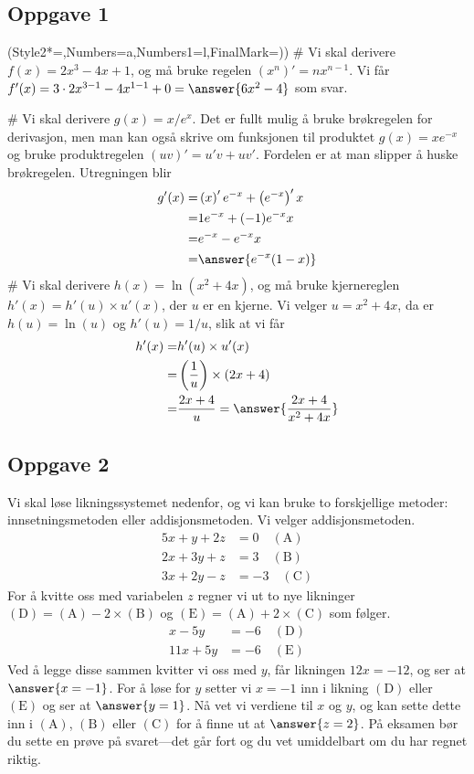 \subsection*{Oppgave 1}
\begin{easylist}[enumerate]
\ListProperties(Style2*=,Numbers=a,Numbers1=l,FinalMark={)})
# Vi skal derivere $f(x) = 2x^3 - 4x + 1$, og må bruke regelen $\left(x^n\right)' = nx^{n-1}$.
Vi får $f'(x) = 3\cdot2x^{3-1} - 4 x ^{1-1} + 0 = \answer{6x^2 - 4}$ som svar.

# Vi skal derivere $g(x) = x / e^x$. Det er fullt mulig å bruke brøkregelen for derivasjon, men man kan også skrive om funksjonen til produktet $g(x) = x e^{-x}$ og bruke produktregelen $(uv)' = u'v + uv'$.
Fordelen er at man slipper å huske brøkregelen.
Utregningen blir
\begin{align*}
	g'(x) =& \left(x \right)' e^{-x} + \left( e^{-x} \right)' x \\
	=& 1 e^{-x} + (-1)e^{-x}  x \\
	=& e^{-x} - e^{-x}  x \\
	=& \answer{e^{-x}(1 - x)}
\end{align*}
# Vi skal derivere $h(x) = \ln \left( x^2 + 4x\right)$, og må bruke kjernereglen $h'(x) = h'(u) \times u'(x)$, der $u$ er en kjerne.
Vi velger $u =x^2 + 4x$, da er $h(u) = \ln(u)$ og $h'(u) = 1/u$, slik at vi får
\begin{align*}
	h'(x) =& h'(u) \times u'(x) \\
	=& \left( \frac{1}{u}  \right) \times \left( 2x + 4 \right) \\
	=& \frac{2x + 4}{u} =  \answer{\frac{2x + 4}{x^2 + 4x}}
\end{align*}
\end{easylist}

\subsection*{Oppgave 2}
Vi skal løse likningssystemet nedenfor, og vi kan bruke to forskjellige metoder: innsetningsmetoden eller addisjonsmetoden.
Vi velger addisjonsmetoden.
\begin{align*}
	5 x + y + 2 z &= 0 \quad (\text{A})\\
	2 x + 3 y + z &= 3 \quad (\text{B})\\
	3 x + 2 y - z &= -3 \quad (\text{C})
\end{align*}
For å kvitte oss med variabelen $z$ regner vi ut to nye likninger $(\text{D}) = (\text{A}) - 2 \times (\text{B})$ og $(\text{E}) = (\text{A}) + 2 \times (\text{C})$ som følger.
\begin{align*}
	x - 5y  &= -6 \quad (\text{D})\\
	11 x + 5 y  &= -6 \quad (\text{E})
\end{align*}
Ved å legge disse sammen kvitter vi oss med $y$, får likningen $12x = -12$, og ser at $\answer{x = -1}$.
For å løse for $y$ setter vi $x=-1$ inn i likning $(\text{D})$ eller $(\text{E})$ og ser at $\answer{y = 1}$.
Nå vet vi verdiene til $x$ og $y$, og kan sette dette inn i $(\text{A})$, $(\text{B})$ eller $(\text{C})$ for å finne ut at $\answer{z = 2}$.
På eksamen bør du sette en prøve på svaret---det går fort og du vet umiddelbart om du har regnet riktig.

